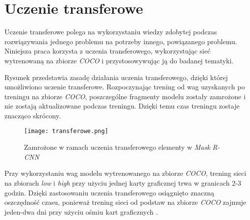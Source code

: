 \newpage
\section{Uczenie transferowe}
\label{sec:uczenie-transferowe}

Uczenie transferowe polega na wykorzystaniu wiedzy zdobytej podczas rozwiązywania jednego problemu na potrzeby innego, powiązanego problemu.
Niniejsza praca korzysta z uczenia transferowego, wykorzystując sieć wytrenowaną na zbiorze \textit{COCO} \cite{coco} i przystosowywując ją do badanej tematyki.

Rysunek  przedstawia zasadę działania uczenia transferowego, dzięki której umożliwiono uczenie transferowe. Rozpoczynając trening od wag uzyskanych po treningu na zbiorze \textit{COCO}, poszczególne fragmenty modelu zostały zamrożone i nie zostają aktualizowane podczas treningu. Dzięki temu czas treningu zostaje znacząco skrócony.

\begin{figure}[h]
  \centering
  \texttt{[image: transferowe.png]}
  \caption{Zamrożone w ramach uczenia transferowego elementy w \textit{Mask R-CNN}}
  \label{fig:transferowe}
\end{figure}

Przy wykorzystaniu wag modelu wytrenowanego na zbiorze \textit{COCO}, trening sieci na zbiorach \textit{low} i \textit{high} przy użyciu jednej karty graficznej trwa w granicach 2-3 godzin. Dzięki zastosowaniu uczenia transferowego osiągnięto znaczną oszczędność czasu, ponieważ trening sieci od podstaw na zbiorze \textit{COCO} zajmuje jeden-dwa dni przy użyciu ośmiu kart graficznych \cite{general-mask-rcnn}.
